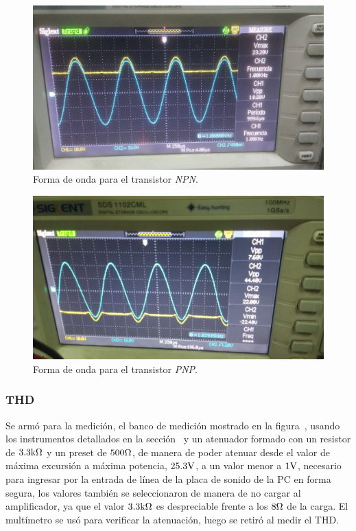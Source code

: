 \begin{figure}[H]
        \centering
        \includegraphics[width=0.95 \textwidth]{./img/mediciones/Switching/2.jpeg}
        \caption{Forma de onda para el transistor \textit{NPN}.}
        \label{fig:switch1}
\end{figure}

\begin{figure}[H]
        \centering
        \includegraphics[width=0.95 \textwidth]{./img/mediciones/Switching/1.jpeg}
        \caption{Forma de onda para el transistor \textit{PNP}.}
        \label{fig:switch2}
\end{figure}


\vfill

\clearpage

\subsubsection{THD}

Se armó para la medición, el banco de medición mostrado en la figura~, usando los instrumentos detallados en la sección~ y un atenuador formado con un resistor de $3.3 \si[per-mode=symbol]{\kilo\ohm}$ y un preset de $500 \si[per-mode=symbol]{\ohm}$, de manera de poder atenuar desde el valor de máxima excursión a máxima potencia, $25.3 \si[per-mode=symbol]{\volt}$, a un valor menor a $1 \si[per-mode=symbol]{\volt}$, necesario para ingresar por la entrada de línea de la placa de sonido de la PC en forma segura, los valores también se seleccionaron de manera de no cargar al amplificador, ya que el valor $3.3 \si[per-mode=symbol]{\kilo\ohm}$ es despreciable frente a los $8 \si[per-mode=symbol]{\ohm}$ de la carga. El multímetro se usó para verificar la atenuación, luego se retiró al medir el THD.



